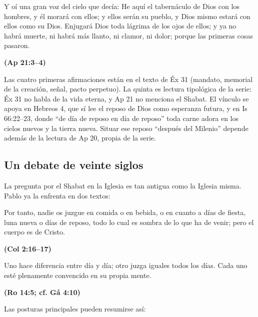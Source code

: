 \documentclass[11pt,letterpaper]{article}
\newcommand{\fuente}[1]{\par\hfill{\upshape\bfseries\small\textcolor{tierraroja}{#1}}}
\begin{document}
\begin{cita}Y oí una gran voz del cielo que decía: He aquí el tabernáculo de Dios con los hombres, y él morará con ellos; y ellos serán su pueblo, y Dios mismo estará con ellos como su Dios. Enjugará Dios toda lágrima de los ojos de ellos; y ya no habrá muerte, ni habrá más llanto, ni clamor, ni dolor; porque las primeras cosas pasaron.\fuente{(Ap 21:3--4)}\end{cita}

\begin{nota}[Precisión]
Las cuatro primeras afirmaciones están en el texto de Éx 31 (mandato, memorial de la creación, señal, pacto perpetuo). La quinta es lectura tipológica de la serie: Éx 31 no habla de la vida eterna, y Ap 21 no menciona el Shabat. El vínculo se apoya en Hebreos 4, que sí lee el reposo de Dios como esperanza futura, y en Is 66:22--23, donde ``de día de reposo en día de reposo'' toda carne adora en los cielos nuevos y la tierra nueva. Situar ese reposo ``después del Milenio'' depende además de la lectura de Ap 20, propia de la serie.
\end{nota}

\subsection{Un debate de veinte siglos}
La pregunta por el Shabat en la Iglesia es tan antigua como la Iglesia misma. Pablo ya la enfrenta en dos textos:

\begin{cita}Por tanto, nadie os juzgue en comida o en bebida, o en cuanto a días de fiesta, luna nueva o días de reposo, todo lo cual es sombra de lo que ha de venir; pero el cuerpo es de Cristo.\fuente{(Col 2:16--17)}\end{cita}

\begin{cita}Uno hace diferencia entre día y día; otro juzga iguales todos los días. Cada uno esté plenamente convencido en su propia mente.\fuente{(Ro 14:5; cf. Gá 4:10)}\end{cita}

Las posturas principales pueden resumirse así:
\end{document}
